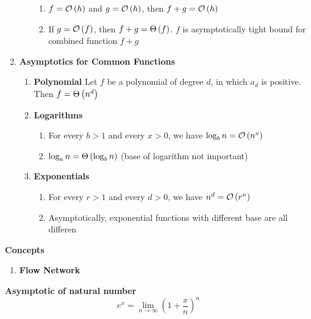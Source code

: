 \documentclass[11pt]{article}
\begin{document}
\begin{defn*}
\begin{enumerate}
\begin{enumerate}
\begin{enumerate}
                \item $f = \mathcal{O}\left( h \right)$ and $g = \mathcal{O}\left( h \right)$, then $f+g = \mathcal{O}\left( h \right)$
                \item If $g = \mathcal{O}\left( f \right)$, then $f+g = \Theta\left( f \right)$. $f$ is asymptotically tight bound for combined function $f+g$
            \end{enumerate}
        \end{enumerate}
        \item \textbf{Asymptotics for Common Functions}
        \begin{enumerate}
            \item \textbf{Polynomial} Let $f$ be a polynomial of degree $d$, in which $a_d$ is positive. Then $f = \Theta\left( n^d \right)$ 
            \item \textbf{Logarithms} 
            \begin{enumerate}
                \item For every $b>1$ and every $x>0$, we have $\log_b n = \mathcal{O}\left( n^x \right)$
                \item $\log_a n = \Theta\left( \log_b n \right)$ (base of logarithm not important)
            \end{enumerate}
            \item \textbf{Exponentials} 
            \begin{enumerate}
                \item For every $r>1$ and every $d > 0$, we have $n^d = \mathcal{O}\left( r^n \right)$
                \item Asymptotically, exponential functions with different base are all differen
            \end{enumerate}
        \end{enumerate}
    \end{enumerate}
\end{defn*}



\begin{defn*}
    \textbf{Concepts}
    \begin{enumerate}
        \item \textbf{Flow Network}
    \end{enumerate}
\end{defn*}




\begin{defn*}
    \textbf{Asymptotic of natural number}
    \[  
        e^x = \lim_{n\to\infty} \left( 1 + \frac{x}{n} \right)^n    
    \]
\end{defn*}
\end{document}
